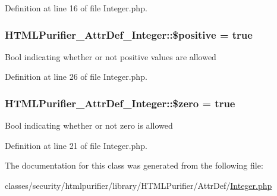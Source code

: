 Definition at line 16 of file Integer.\+php.

\hypertarget{classHTMLPurifier__AttrDef__Integer_a43924be8ea747daf7d9f25403827db79}{
\subsubsection[{\$positive}]{\setlength{\rightskip}{0pt plus 5cm}H\+T\+M\+L\+Purifier\+\_\+\+Attr\+Def\+\_\+\+Integer\+::\$positive = true\hspace{0.3cm}{\ttfamily [protected]}}}\label{classHTMLPurifier__AttrDef__Integer_a43924be8ea747daf7d9f25403827db79}
Bool indicating whether or not positive values are allowed 

Definition at line 26 of file Integer.\+php.

\hypertarget{classHTMLPurifier__AttrDef__Integer_ae3b61a5ba24479d2104accc5eb11b3c5}{
\subsubsection[{\$zero}]{\setlength{\rightskip}{0pt plus 5cm}H\+T\+M\+L\+Purifier\+\_\+\+Attr\+Def\+\_\+\+Integer\+::\$zero = true\hspace{0.3cm}{\ttfamily [protected]}}}\label{classHTMLPurifier__AttrDef__Integer_ae3b61a5ba24479d2104accc5eb11b3c5}
Bool indicating whether or not zero is allowed 

Definition at line 21 of file Integer.\+php.



The documentation for this class was generated from the following file\+:\begin{DoxyCompactItemize}
\item 
classes/security/htmlpurifier/library/\+H\+T\+M\+L\+Purifier/\+Attr\+Def/\hyperlink{Integer_8php}{Integer.\+php}\end{DoxyCompactItemize}
